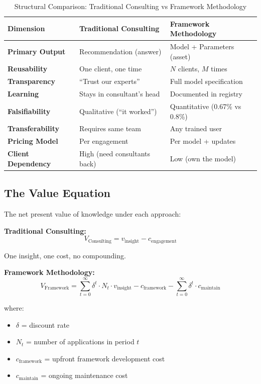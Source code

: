 \begin{table}[htbp]
\centering
\caption{Structural Comparison: Traditional Consulting vs Framework Methodology}
\label{tab:fm-comparison}
\renewcommand{\arraystretch}{1.4}
\begin{tabular}{@{}p{3.5cm}p{5cm}p{5cm}@{}}
\toprule
\textbf{Dimension} & \textbf{Traditional Consulting} & \textbf{Framework Methodology} \\
\midrule
\textbf{Primary Output} & Recommendation (answer) & Model + Parameters (asset) \\
\textbf{Reusability} & One client, one time & $N$ clients, $M$ times \\
\textbf{Transparency} & ``Trust our experts'' & Full model specification \\
\textbf{Learning} & Stays in consultant's head & Documented in registry \\
\textbf{Falsifiability} & Qualitative (``it worked'') & Quantitative (0.67\% vs 0.8\%) \\
\textbf{Transferability} & Requires same team & Any trained user \\
\textbf{Pricing Model} & Per engagement & Per model + updates \\
\textbf{Client Dependency} & High (need consultants back) & Low (own the model) \\
\bottomrule
\end{tabular}
\end{table}

\subsection{The Value Equation}

The net present value of knowledge under each approach:

\textbf{Traditional Consulting:}
\begin{equation}
V_{\text{Consulting}} = v_{\text{insight}} - c_{\text{engagement}}
\end{equation}

One insight, one cost, no compounding.

\textbf{Framework Methodology:}
\begin{equation}
V_{\text{Framework}} = \sum_{t=0}^{\infty} \delta^t \cdot N_t \cdot v_{\text{insight}} - c_{\text{framework}} - \sum_{t=0}^{\infty} \delta^t \cdot c_{\text{maintain}}
\end{equation}

where:
\begin{itemize}[nosep]
    \item $\delta$ = discount rate
    \item $N_t$ = number of applications in period $t$
    \item $c_{\text{framework}}$ = upfront framework development cost
    \item $c_{\text{maintain}}$ = ongoing maintenance cost
\end{itemize}


